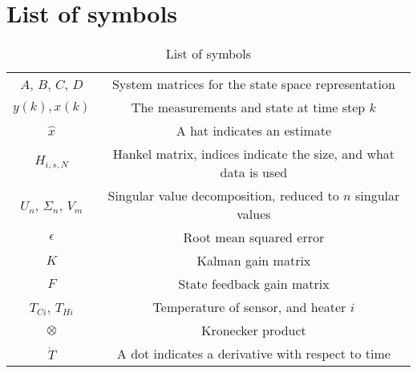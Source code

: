 \section{List of symbols}
\begin{table}[h]
    \centering
    \caption{List of symbols}
    \begin{tabular}{c|c}
         $A$, $B$, $C$, $D$  & System matrices for the state space representation \\
         $y(k), x(k)$ & The measurements and state at time step $k$\\
         $\hat{x}$ & A hat indicates an estimate\\
         $H_{i,s,N}$ & Hankel matrix, indices indicate the size, and what data is used \\
         $U_n$, $\Sigma_n$, $V_m$ & Singular value decomposition, reduced to $n$ singular values\\
         $\epsilon$ & Root mean squared error \\
         $K$ & Kalman gain matrix\\
         $F$ & State feedback gain matrix\\
         $T_{Ci}$, $T_{Hi}$ & Temperature of sensor, and heater $i$\\
         $\otimes$ & Kronecker product \\
         $\dot{T}$ & A dot indicates a derivative with respect to time
         
    \end{tabular}
    \label{tab:symbols}
\end{table}